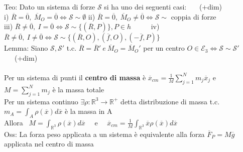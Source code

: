 \documentclass{article}
\begin{document}
%
Teo: Dato un sistema di forze $\mathcal{S}$ si ha uno dei seguenti casi: \ \ \ (+dim)\\
\phantom{\ \ \ \ \ \ } i) $\overline{R}=\overline{0}, \ \overline{M}_O=\overline{0} \Leftrightarrow \mathcal{S}\sim\emptyset$ \hspace{0.77in}
ii) $\overline{R}=\overline{0}, \ \overline{M}_O\neq\overline{0} \Leftrightarrow \mathcal{S}\sim$ coppia di forze \\
\phantom{\ \ \ \ \ \ } iii) $\overline{R}\neq\overline{0}, \ I=\overline{0} \Leftrightarrow \mathcal{S}\sim\{(\overline{R},P)\}, P\in h$ \ \ \ \ \
iv) $\overline{R}\neq\overline{0}, \ I\neq\overline{0} \Leftrightarrow \mathcal{S}\sim\{(\overline{R},O),(\overline{f},O),(-\overline{f},P)\}$ \\
%
Lemma: Siano $\mathcal{S}, \mathcal{S}'$ t.c. $\overline{R}=\overline{R}' \ e \ \overline{M}_O=\overline{M}_O'$ per un centro $O \in \mathcal{E}_3 \Leftrightarrow \mathcal{S} \sim \mathcal{S}'$ \ \ \ (+dim)\\ \\
%
%
%
Per un sistema di punti il \textbf{centro di massa} è $\overline{x}_{cm}=\frac{1}M \sum_{j=1}^Nm_j\overline{x}_j$ e $M=\sum_{j=1}^Nm_j$ è la massa totale \\
%
Per un sistema continuo $\exists \rho :\mathbb{R}^3\rightarrow\mathbb{R}^+$ detta distribuzione di massa t.c. \ $m_A=\int_A\rho(\overline{x})d\overline{x}$ è la massa in A\\
\phantom{\ \ \ \ } Allora \  $M=\int_{\mathbb{R}^3}\rho(\overline{x})d\overline{x}$ \ \ e \ \ $\overline{x}_{cm}=\frac{1}M \int_{\mathbb{R}^3} \overline{x}\rho(\overline{x})d\overline{x}$ \\
%
%
Oss: La forza peso applicata a un sistema è equivalente alla forza $\overline{F}_P=M\overline{g}$ applicata nel centro di massa
%
%
\end{document}
